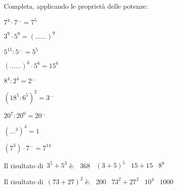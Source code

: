 \begin{esercizio}
 Completa, applicando le proprietà delle potenze:
\begin{multicols}{3}
 \begin{enumeratea}
 \item \(7^4\cdot7^{\ldots}=7^5\)
 \item \(3^9\cdot5^9=(\ldots\ldots)^9\)
 \item \(5^{15}:5^{\ldots}=5^5\)
 \item \((\ldots\ldots)^6\cdot5^6=15^6\)
 \item \(8^4:2^4=2^{\ldots}\)
 \item \((18^5:6^5)^2=3^{\ldots}\)
 \item \(20^7:20^0=20^{\ldots}\)
 \item \((\ldots^3)^4=1\)
 \item \((7^3) \cdot 7^{\dots}=7^{14}\)
 \end{enumeratea}
\end{multicols}
\end{esercizio}

\begin{esercizio}
 Il risultato di~\(3^5+5^3\) è: \quad \quad \quad \quad
 \boxA\enspace~368 \quad \boxB\enspace~\((3+5)^5\) \quad 
\boxC\enspace~\(15+15\) \quad \boxD\enspace~\(8^8\)
 \end{esercizio}

\begin{esercizio}
 Il risultato di~\((73+27)^2\) è: \quad \quad
 \boxA\enspace~200 \quad\boxB\enspace~\(73^2+27^2\) 
\quad\boxC\enspace~\(10^4\) \quad\boxD\enspace~\(1000\)
\end{esercizio}


\subsubsection*{}

